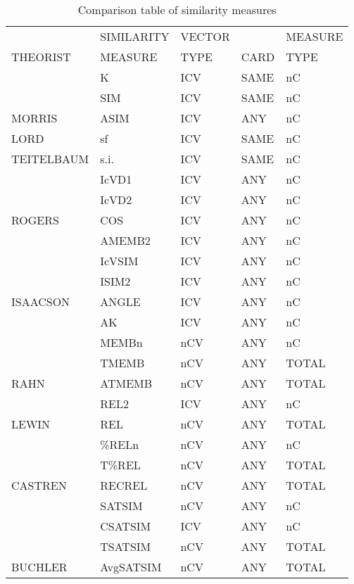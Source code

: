\documentclass{article}
\begin{document}
\begin{table}[htb]
\caption{Comparison table of similarity measures} 
\begin{center}
\begin{tabular}{lllll}
\hline
             &  SIMILARITY  &  VECTOR  &        &  MEASURE  \\
 THEORIST    &  MEASURE     &  TYPE    &  CARD  &  TYPE     \\
\hline
             &  K           &  ICV     &  SAME  &  nC       \\
             &  SIM         &  ICV     &  SAME  &  nC       \\
 MORRIS      &  ASIM        &  ICV     &  ANY   &  nC       \\
\hline
 LORD        &  sf          &  ICV     &  SAME  &  nC       \\
\hline
 TEITELBAUM  &  s.i.        &  ICV     &  SAME  &  nC       \\
\hline
             &  IcVD1       &  ICV     &  ANY   &  nC       \\
             &  IcVD2       &  ICV     &  ANY   &  nC       \\
 ROGERS      &  COS         &  ICV     &  ANY   &  nC       \\
\hline
             &  AMEMB2      &  ICV     &  ANY   &  nC       \\
             &  IcVSIM      &  ICV     &  ANY   &  nC       \\
             &  ISIM2       &  ICV     &  ANY   &  nC       \\
 ISAACSON    &  ANGLE       &  ICV     &  ANY   &  nC       \\
\hline
             &  AK          &  ICV     &  ANY   &  nC       \\
             &  MEMBn       &  nCV     &  ANY   &  nC       \\
             &  TMEMB       &  nCV     &  ANY   &  TOTAL    \\
 RAHN        &  ATMEMB      &  nCV     &  ANY   &  TOTAL    \\
\hline
             &  REL2        &  ICV     &  ANY   &  nC       \\
 LEWIN       &  REL         &  nCV     &  ANY   &  TOTAL    \\
\hline
             &  \%RELn      &  nCV     &  ANY   &  nC       \\
             &  T\%REL      &  nCV     &  ANY   &  TOTAL    \\
 CASTREN     &  RECREL      &  nCV     &  ANY   &  TOTAL    \\
\hline
             &  SATSIM      &  nCV     &  ANY   &  nC       \\
             &  CSATSIM     &  ICV     &  ANY   &  nC       \\
             &  TSATSIM     &  nCV     &  ANY   &  TOTAL    \\
 BUCHLER     &  AvgSATSIM   &  nCV     &  ANY   &  TOTAL    \\
\hline
\end{tabular}
\end{center}
\end{table}
\end{document}
